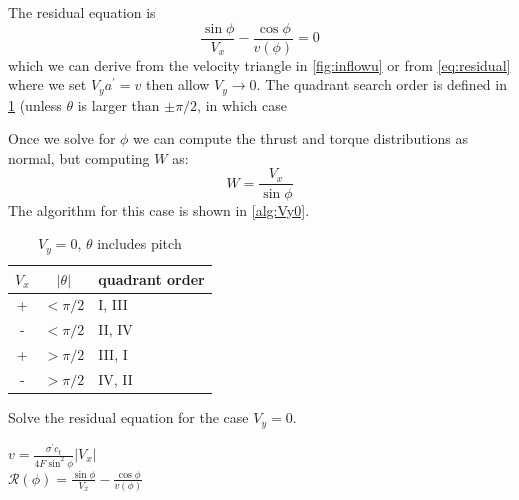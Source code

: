\documentclass{article}
\begin{document}
The residual equation is
\begin{equation}
    \frac{\sin\phi}{V_x} - \frac{\cos\phi}{v(\phi)} = 0
    \label{eq:noVyresid}
\end{equation}
which we can derive from the velocity triangle in \cref{fig:inflowu} or from \cref{eq:residual} where we set $V_y a^\prime = v$ then allow $V_y \rightarrow 0$.  The quadrant search order is defined in \cref{tab:bracket3} (unless $\theta$ is larger than $\pm \pi/2$, in which case

Once we solve for $\phi$ we can compute the thrust and torque distributions as normal, but computing $W$ as:
\begin{equation}
    W = \frac{V_x}{\sin\phi}
\end{equation}
The algorithm for this case is shown in \cref{alg:Vy0}.

\begin{table}[htb]
\centering
\caption{$V_y = 0$, $\theta$ includes pitch}
\label{tab:bracket3}
\begin{tabular}{@{}ccl@{}}
\toprule
$V_x$ & $|\theta|$ & quadrant order \\
\midrule
+ & $< \pi/2$ & I, III \\
- & $< \pi/2$ & II, IV \\
+ & $> \pi/2$ & III, I \\
- & $> \pi/2$ & IV, II \\
\bottomrule
\end{tabular}
\end{table}

\begin{algorithm}[htbp]
\caption{Solve the residual equation for the case $V_y = 0$.}
\begin{algorithmic}
\State $v = \frac{\sigma^\prime c_t}{4 F \sin^2\phi} |V_x|$
\\
\State $\mathcal{R}(\phi) = \frac{\sin\phi}{V_x} - \frac{\cos\phi}{v(\phi)}$

\end{algorithmic}
\label{alg:Vy0}
\end{algorithm}

\end{document}
